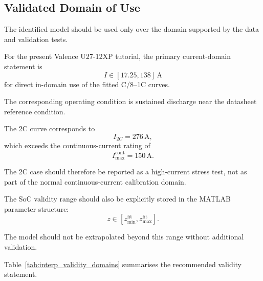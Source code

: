 \documentclass[a4paper,12pt]{article}
\begin{document}
\subsection{Validated Domain of Use}

The identified model should be used only over the domain supported by the data and validation tests.

For the present Valence U27-12XP tutorial, the primary current-domain statement is
\begin{equation}
I
\in
[17.25,138]\,\mathrm{A}
\label{eq:interp_valid_current_range}
\end{equation}
for direct in-domain use of the fitted C/8--1C curves.

The corresponding operating condition is sustained discharge near the datasheet reference condition.

The 2C curve corresponds to
\begin{equation}
I_{2C}
=
276\,\mathrm{A},
\label{eq:interp_2c_current}
\end{equation}
which exceeds the continuous-current rating of
\begin{equation}
I_{\max}^{\mathrm{cont}}
=
150\,\mathrm{A}.
\label{eq:interp_cont_current_limit}
\end{equation}

The 2C case should therefore be reported as a high-current stress test, not as part of the normal continuous-current calibration domain.

The SoC validity range should also be explicitly stored in the MATLAB parameter structure:
\begin{equation}
z
\in
[z_{\min}^{\mathrm{fit}},z_{\max}^{\mathrm{fit}}].
\label{eq:interp_valid_soc_range}
\end{equation}

The model should not be extrapolated beyond this range without additional validation.

Table~\ref{tab:interp_validity_domains} summarises the recommended validity statement.
\end{document}
